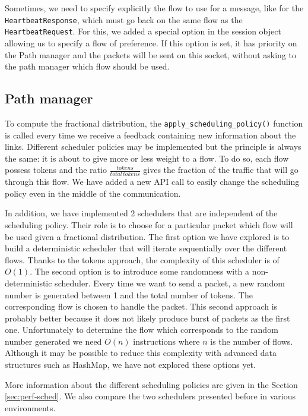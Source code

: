 Sometimes, we need to specify explicitly the flow to use for a message, like for the \texttt{HeartbeatResponse}, which must go back on the same flow as the \texttt{HeartbeatRequest}. For this, we added a special option in the session object allowing us to specify a flow of preference. If this option is set, it has priority on the Path manager and the packets will be sent on this socket, without asking to the path manager which flow should be used.

\subsection{Path manager}\label{ssec:pathmanager}

To compute the fractional distribution, the \texttt{apply\_scheduling\_policy()} function is called every time we receive a feedback containing new information about the links. Different scheduler policies may be implemented but the principle is always the same: it is about to give more or less weight to a flow. To do so, each flow possess tokens and the ratio $\frac{tokens}{total\,tokens}$ gives the fraction of the traffic that will go through this flow. We have added a new API call to easily change the scheduling policy even in the middle of the communication.

In addition, we have implemented 2 schedulers that are independent of the scheduling policy. Their role is to choose for a particular packet which flow will be used given a fractional distribution. The first option we have explored is to build a deterministic scheduler that will iterate sequentially over the different flows. Thanks to the tokens approach, the complexity of this scheduler is of $O(1)$. The second option is to introduce some randomness with a non-deterministic scheduler. Every time we want to send a packet, a new random number is generated between 1 and the total number of tokens. The corresponding flow is chosen to handle the packet. This second approach is probably better because it does not likely produce burst of packets as the first one. Unfortunately to determine the flow which corresponds to the random number generated we need $O(n)$ instructions where $n$ is the number of flows. Although it may be possible to reduce this complexity with advanced data structures such as HashMap, we have not explored these options yet.

More information about the different scheduling policies are given in the Section \ref{sec:perf-sched}. We also compare the two schedulers presented before in various environments.

